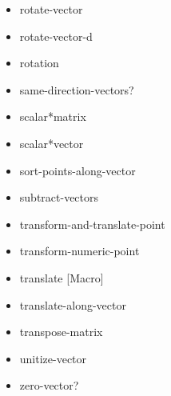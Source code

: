 \documentclass [11pt]{book}
\begin{document}
\begin{itemize}
\item {}rotate-vector





\item {}rotate-vector-d





\item {}rotation





\item {}same-direction-vectors?





\item {}scalar*matrix





\item {}scalar*vector





\item {}sort-points-along-vector





\item {}subtract-vectors





\item {}transform-and-translate-point





\item {}transform-numeric-point





\item {}translate [Macro]





\item {}translate-along-vector





\item {}transpose-matrix





\item {}unitize-vector





\item {}zero-vector?





\end{itemize}
\end{document}
